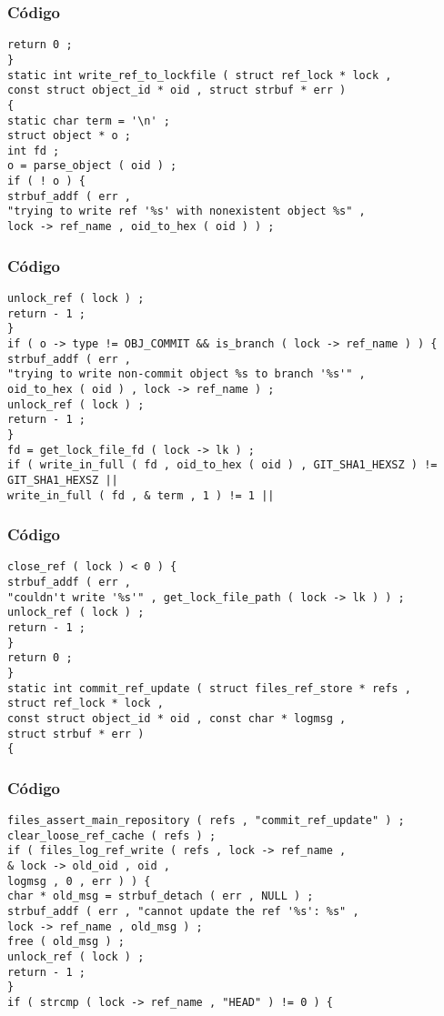 \documentclass{beamer}
\begin{document}
\begin{frame}[fragile]
\frametitle{C\'odigo}
\begin{verbatim}
return 0 ; 
} 
static int write_ref_to_lockfile ( struct ref_lock * lock , 
const struct object_id * oid , struct strbuf * err ) 
{ 
static char term = '\n' ; 
struct object * o ; 
int fd ; 
o = parse_object ( oid ) ; 
if ( ! o ) { 
strbuf_addf ( err , 
"trying to write ref '%s' with nonexistent object %s" , 
lock -> ref_name , oid_to_hex ( oid ) ) ; 
\end{verbatim}
\end{frame}
\begin{frame}[fragile]
\frametitle{C\'odigo}
\begin{verbatim}
unlock_ref ( lock ) ; 
return - 1 ; 
} 
if ( o -> type != OBJ_COMMIT && is_branch ( lock -> ref_name ) ) { 
strbuf_addf ( err , 
"trying to write non-commit object %s to branch '%s'" , 
oid_to_hex ( oid ) , lock -> ref_name ) ; 
unlock_ref ( lock ) ; 
return - 1 ; 
} 
fd = get_lock_file_fd ( lock -> lk ) ; 
if ( write_in_full ( fd , oid_to_hex ( oid ) , GIT_SHA1_HEXSZ ) != GIT_SHA1_HEXSZ || 
write_in_full ( fd , & term , 1 ) != 1 || 
\end{verbatim}
\end{frame}
\begin{frame}[fragile]
\frametitle{C\'odigo}
\begin{verbatim}
close_ref ( lock ) < 0 ) { 
strbuf_addf ( err , 
"couldn't write '%s'" , get_lock_file_path ( lock -> lk ) ) ; 
unlock_ref ( lock ) ; 
return - 1 ; 
} 
return 0 ; 
} 
static int commit_ref_update ( struct files_ref_store * refs , 
struct ref_lock * lock , 
const struct object_id * oid , const char * logmsg , 
struct strbuf * err ) 
{ 
\end{verbatim}
\end{frame}
\begin{frame}[fragile]
\frametitle{C\'odigo}
\begin{verbatim}
files_assert_main_repository ( refs , "commit_ref_update" ) ; 
clear_loose_ref_cache ( refs ) ; 
if ( files_log_ref_write ( refs , lock -> ref_name , 
& lock -> old_oid , oid , 
logmsg , 0 , err ) ) { 
char * old_msg = strbuf_detach ( err , NULL ) ; 
strbuf_addf ( err , "cannot update the ref '%s': %s" , 
lock -> ref_name , old_msg ) ; 
free ( old_msg ) ; 
unlock_ref ( lock ) ; 
return - 1 ; 
} 
if ( strcmp ( lock -> ref_name , "HEAD" ) != 0 ) { 
\end{verbatim}
\end{frame}
\end{document}
